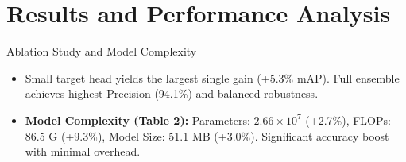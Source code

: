 \documentclass{beamer}
\begin{document}
\section{Results and Performance Analysis}

\begin{frame}{Ablation Study and Model Complexity}
\begin{table}[h]
\centering
\caption{\scriptsize Ablation experiment results on test dataset (Source: Base Paper Table 1)}
\vspace{-0.3cm}
\setlength{\tabcolsep}{3pt}
\renewcommand{\arraystretch}{0.92}
\end{table}
\vspace{-0.35cm}
{\small
\begin{itemize}
    \setlength{\itemsep}{1pt}
    \item Small target head yields the largest single gain (+5.3\% mAP). Full ensemble achieves highest Precision (94.1\%) and balanced robustness.
    \item \textbf{Model Complexity (Table 2):} Parameters: $2.66 \times 10^7$ (+2.7\%), FLOPs: 86.5 G (+9.3\%), Model Size: 51.1 MB (+3.0\%). Significant accuracy boost with minimal overhead.
\end{itemize}
}
\end{frame}
\end{document}
